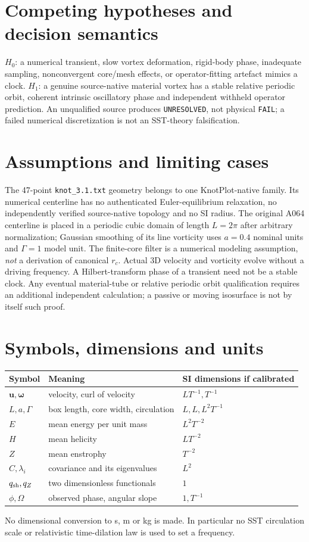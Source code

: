 \documentclass[11pt,a4paper]{article}
\begin{document}
\section{Competing hypotheses and decision semantics}
$H_0$: a numerical transient, slow vortex deformation, rigid-body phase, inadequate sampling, nonconvergent core/mesh effects, or operator-fitting artefact mimics a clock. $H_1$: a genuine source-native material vortex has a stable relative periodic orbit, coherent intrinsic oscillatory phase and independent withheld operator prediction. An unqualified source produces \texttt{UNRESOLVED}, not physical \texttt{FAIL}; a failed numerical discretization is not an SST-theory falsification.

\section{Assumptions and limiting cases}
The 47-point \texttt{knot\_3.1.txt} geometry belongs to one KnotPlot-native family. Its numerical centerline has no authenticated Euler-equilibrium relaxation, no independently verified source-native topology and no SI radius. The original A064 centerline is placed in a periodic cubic domain of length $L=2\pi$ after arbitrary normalization; Gaussian smoothing of its line vorticity uses $a=0.4$ nominal units and $\Gamma=1$ model unit. The finite-core filter is a numerical modeling assumption, \emph{not} a derivation of canonical $r_c$. Actual 3D velocity and vorticity evolve without a driving frequency. A Hilbert-transform phase of a transient need not be a stable clock. Any eventual material-tube or relative periodic orbit qualification requires an additional independent calculation; a passive or moving isosurface is not by itself such proof.

\section{Symbols, dimensions and units}
\begin{longtable}{lll}\toprule Symbol & Meaning & SI dimensions if calibrated \\\midrule
$\mathbf u,\bm\omega$ & velocity, curl of velocity & $LT^{-1},T^{-1}$\\
$L,a,\Gamma$ & box length, core width, circulation & $L,L,L^2T^{-1}$\\
$E$ & mean energy per unit mass & $L^2T^{-2}$\\
$H$ & mean helicity & $LT^{-2}$\\
$Z$ & mean enstrophy & $T^{-2}$\\
$C,\lambda_i$ & covariance and its eigenvalues & $L^2$\\
$q_{\rm sh},q_Z$ & two dimensionless functionals & $1$\\
$\phi,\widehat\Omega$ & observed phase, angular slope & $1,T^{-1}$\\\bottomrule\end{longtable}
No dimensional conversion to s, m or kg is made. In particular no SST circulation scale or relativistic time-dilation law is used to set a frequency.
\end{document}
